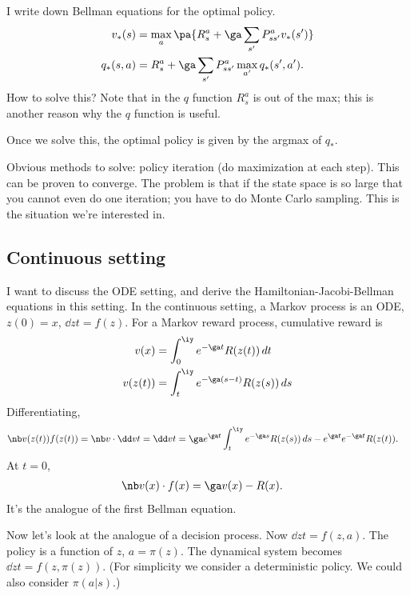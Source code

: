 I write down Bellman equations for the optimal policy. 
\begin{align}
v_*(s) &= \max_a \pa{R_s^a + \ga \sum_{s'} P_{ss'}^a v_*(s')}\\
q_*(s,a) &=R_s^a + \ga \sum_{s'}P_{ss'}^a \max_{a'}q_*(s',a').
\end{align}
How to solve this? Note that in the $q$ function $R_s^a$ is out of the max; this is another reason why the $q$ function is useful.

Once we solve this, the optimal policy is given by the argmax of $q_*$.

Obvious methods to solve: policy iteration (do maximization at each step). This can be proven to converge. The problem is that if the state space is so large that you cannot even do one iteration; you have to do Monte Carlo sampling. This is the situation we're interested in.

\subsection{Continuous setting}

I want to discuss the ODE setting, and derive the Hamiltonian-Jacobi-Bellman equations in this setting. In the continuous setting, a Markov process is an ODE, $z(0)=x$, $\dd zt = f(z)$. For a Markov reward process, cumulative reward is
\begin{align}
v(x) &=\int_0^\iy e^{-\ga t} R(z(t))\,dt\\
v(z(t)) &= \int_t^\iy e^{-\ga(s-t)} R(z(s))\,ds
\end{align}
Differentiating,
\begin{align}
\nb v(z(t)) f(z(t)) = \nb v \cdot \dd vt
=\dd vt &= \ga e^{\ga t} \int_t^\iy e^{-\ga s} R(z(s))\,ds - e^{\ga t} e^{-\ga t}R(z(t)).
\end{align}
At $t=0$,
\begin{align}
\nb v(x)\cdot f(x) &= \ga v(x)-R(x).
\end{align}
It's the analogue of the first Bellman equation.

Now let's look at the analogue of a decision process.
Now $\dd zt = f(z,a)$. The policy is a function of $z$, $a=\pi(z)$. The dynamical system becomes $\dd zt = f(z,\pi(z))$.  (For simplicity we consider a deterministic policy. We could also consider $\pi(a|s)$.)

